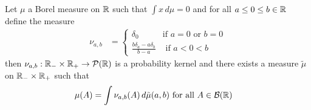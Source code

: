\begin{lem}\label{MixtureTwoPoint}Let $\mu$ a Borel measure on $\mathbb{R}$ such that $\int x \,
  d\mu = 0$ and for all $a \leq 0 \leq b \in \mathbb{R}$ define the measure
\begin{align*}
\nu_{a,b} &=  \begin{cases}
\delta_0 & \text{if $a=0$ or $b=0$} \\
\frac{b \delta_a - a \delta_b}{b - a} & \text{ if $a < 0 < b$}
\end{cases}
\end{align*}
then $\nu_{a,b} : \mathbb{R}_{-} \times \mathbb{R}_+ \to \mathcal{P}(\mathbb{R})$ is a probability kernel and there exists a measure $\tilde{\mu}$ on $\mathbb{R}_{-}
\times\mathbb{R}_+$ such that 
\begin{align*}
\mu(A) &= \int \nu_{a,b}(A) \, d\tilde{\mu}(a,b) \text{ for all $A \in \mathcal{B}(\mathbb{R})$}
\end{align*}
\end{lem}
